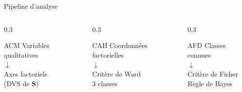 \documentclass[aspectratio=169, 10pt]{beamer}
\begin{document}
\begin{frame}{Pipeline d'analyse}
	\vspace{10pt}
	\begin{columns}[T]
		\begin{column}{0.3\textwidth}
			\begin{block}{\hfill ACM\hfill} %
				\centering\scriptsize
				Variables qualitatives\\
				$\downarrow$\\
				Axes factoriels\\
				(DVS de $\mathbf{S}$)
			\end{block}
		\end{column}
		\begin{column}{0.3\textwidth}
			\begin{block}{\hfill CAH\hfill} %
				\centering\scriptsize
				Coordonnées factorielles\\
				$\downarrow$\\
				Critère de Ward\\
				3 classes
			\end{block}
		\end{column}
		\begin{column}{0.3\textwidth}
			\begin{block}{\hfill AFD\hfill} %
				\centering\scriptsize
				Classes connues\\
				$\downarrow$\\
				Critère de Fisher\\
				Règle de Bayes
			\end{block}
		\end{column}
	\end{columns}
\end{frame}
\end{document}
